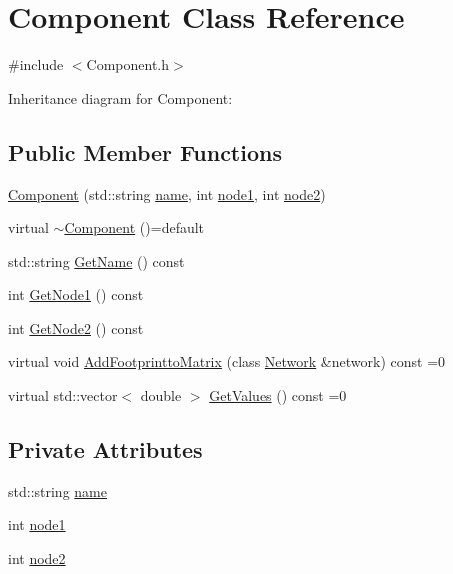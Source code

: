 \hypertarget{classComponent}{}\section{Component Class Reference}
\label{classComponent}


{\ttfamily \#include $<$Component.\+h$>$}



Inheritance diagram for Component\+:
\subsection*{Public Member Functions}
\begin{DoxyCompactItemize}
\item 
\hyperlink{classComponent_a0af3b5b3c3463d6e617ec791900f4c6b}{Component} (std\+::string \hyperlink{classComponent_a46343549452bda5ee9752f7a9bc15efb}{name}, int \hyperlink{classComponent_a7d8cd23c0aaff5c139b825e77c0b2051}{node1}, int \hyperlink{classComponent_af96df64e1eb5fac7dae7c674cac3d31e}{node2})
\item 
virtual \hyperlink{classComponent_ad82d7393e339c1b19cc17a0d55b5674d}{$\sim$\+Component} ()=default
\item 
std\+::string \hyperlink{classComponent_a9af52e1878212622948ab2189f4f29dd}{Get\+Name} () const
\item 
int \hyperlink{classComponent_af6503c2bf9a88eff198ffbfcc3e24876}{Get\+Node1} () const
\item 
int \hyperlink{classComponent_aac8e1e6f5ecd3529912bd4afa0903921}{Get\+Node2} () const
\item 
virtual void \hyperlink{classComponent_a833d40a0f50c3c06dcab2e035b758e6f}{Add\+Footprintto\+Matrix} (class \hyperlink{classNetwork}{Network} \&network) const =0
\item 
virtual std\+::vector$<$ double $>$ \hyperlink{classComponent_a7c6ba16177143bc9945583a9c3df4c89}{Get\+Values} () const =0
\end{DoxyCompactItemize}
\subsection*{Private Attributes}
\begin{DoxyCompactItemize}
\item 
std\+::string \hyperlink{classComponent_a46343549452bda5ee9752f7a9bc15efb}{name}
\item 
int \hyperlink{classComponent_a7d8cd23c0aaff5c139b825e77c0b2051}{node1}
\item 
int \hyperlink{classComponent_af96df64e1eb5fac7dae7c674cac3d31e}{node2}
\end{DoxyCompactItemize}


